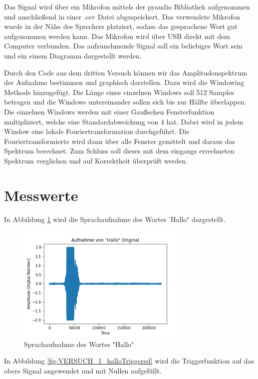 \documentclass[12pt, oneside, a4paper, \docLanguage]{report}
\begin{document}
Das Signal wird über ein Mikrofon mittels der pyaudio Bibliothek aufgenommen und anschließend in einer .csv Datei abgespeichert. Das verwendete Mikrofon wurde in der Nähe des Sprechers platziert, sodass das gesprochene Wort gut aufgenommen werden kann. Das Mikrofon wird über USB direkt mit dem Computer verbunden. Das aufzunehmende Signal soll ein beliebiges Wort sein und ein einem Diagramm dargestellt werden.

Durch den Code aus dem dritten Versuch können wir das Amplitudenspektrum der Aufnahme bestimmen und graphisch darstellen. Dazu wird die Windowing Methode hinzugefügt. Die Länge eines einzelnen Windows soll 512 Samples betragen und die Windows untereinander sollen sich bis zur Hälfte überlappen. Die einzelnen Windows werden mit einer Gaußschen Fensterfunktion multipliziert, welche eine Standardabweichung von 4 hat. Dabei wird in jedem Window eine lokale Fouriertransformation durchgeführt. Die Fouriertransformierte wird dann über alle Fenster gemittelt und daraus das Spektrum berechnet. Zum Schluss soll dieses mit dem eingangs errechneten Spektrum verglichen und auf Korrektheit überprüft werden.

\section{Messwerte}
\label{chap:VERSUCH_1_MESSWERTE}
In Abbildung \ref{fig:VERSUCH_1_halloOriginal} wird die Sprachaufnahme des Wortes 'Hallo" dargestellt.

\begin{figure}[H]
	\centering\small
	\includegraphics[width=0.75\textwidth]{media/AufnahmeHalloOriginal.png}
	\caption{Sprachaufnahme des Wortes "Hallo"}
	\label{fig:VERSUCH_1_halloOriginal}
\end{figure}

In Abbildung \ref{fig:VERSUCH_1_halloTriggered} wird die Triggerfunktion auf das obere Signal angewendet und mit Nullen aufgefüllt.
\end{document}
